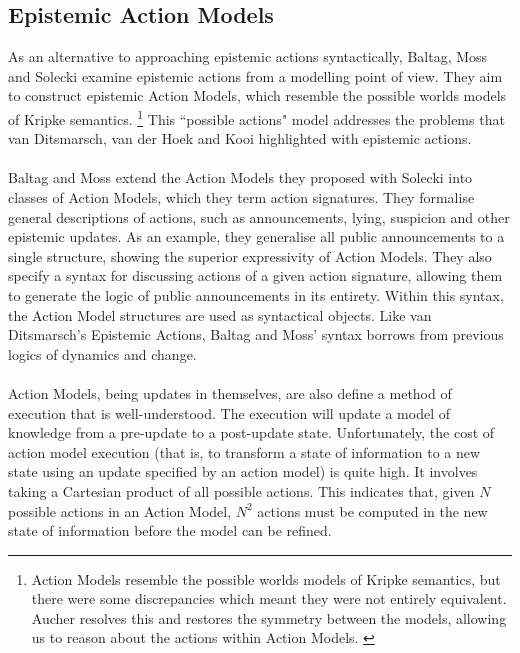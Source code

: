 \documentclass[12pt, a4paper, twoside]{article}
\begin{document}
\subsection{Epistemic Action Models} \label{act_mods}
As an alternative to approaching epistemic actions syntactically, Baltag, Moss
and Solecki examine epistemic actions from a modelling point of view.
They aim to construct epistemic Action Models, which resemble the possible
worlds models of Kripke semantics. \citep{baltag1998lpa}
\footnote{Action Models resemble the possible worlds models of Kripke semantics,
but there were some discrepancies which meant they were not entirely equivalent.
Aucher resolves this and restores the symmetry between the models, allowing us
to reason about the actions within Action Models. \citep{aucher09revisited}}
This ``possible actions" model addresses the problems that van Ditsmarsch, van
der Hoek and Kooi highlighted with epistemic actions.\\
\\
Baltag and Moss extend the Action Models they proposed with Solecki into classes
of Action Models, which they term action signatures. \citep{baltag2005programs}
They formalise general descriptions of actions, such as announcements, lying,
suspicion and other epistemic updates.
As an example, they generalise all public announcements to a single structure,
showing the superior expressivity of Action Models.
They also specify a syntax for discussing actions of a given action signature,
allowing them to generate the logic of public announcements in its entirety.
Within this syntax, the Action Model structures are used as syntactical objects.
Like van Ditsmarsch's Epistemic Actions, Baltag and Moss' syntax borrows from
previous logics of dynamics and change.\\
\\
Action Models, being updates in themselves, are also define a method of
execution that is well-understood.
The execution will update a model of knowledge from a pre-update to a
post-update state.
Unfortunately, the cost of action model execution (that is, to transform a state
of information to a new state using an update specified by an action model) is
quite high.
It involves taking a Cartesian product of all possible actions.
This indicates that, given $N$ possible actions in an Action Model, $N^2$
actions must be computed in the new state of information before the model can
be refined.
\end{document}
